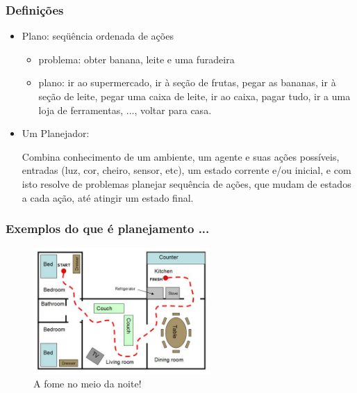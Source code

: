 \begin{frame}[fragile]

  \frametitle{Definições}

   \begin{block}{}
     \begin{itemize}
      \item Plano: seqüência ordenada de ações
       \pause
         \begin{itemize}
           \item problema: obter banana, leite e uma furadeira
            \item plano: ir ao supermercado, ir à seção de frutas, pegar as bananas, ir à seção de leite, pegar uma caixa de leite, ir ao caixa,  pagar tudo, ir a uma loja de ferramentas, ..., voltar para casa.
                                
         \end{itemize}
       
       \item Um Planejador:
         
       \pause
        Combina conhecimento de um ambiente, um agente e suas ações possíveis,
        entradas (luz, cor, cheiro, sensor, etc), um estado corrente
        e/ou inicial, e com isto resolve de problemas planejar sequência
        de ações, que mudam de estados a cada ação, até atingir um 
        estado final.
       
    \end{itemize}
    
    \end{block}
    
\end{frame}



\begin{frame}[fragile]
\frametitle{Exemplos do que é planejamento ...}

\begin{figure}[!htb]
\centering
\includegraphics[width=0.60\textwidth, height=0.650\textheight]{figures/planning01.jpg}
\caption{A fome no meio da noite!}
\end{figure}


\end{frame}


